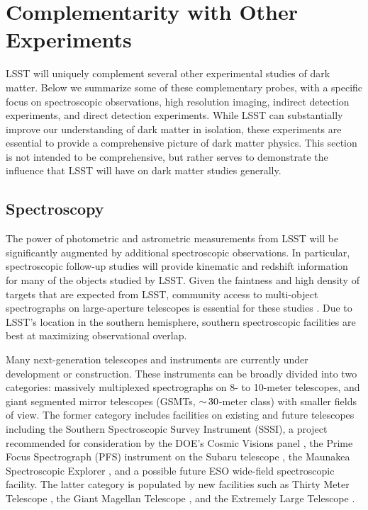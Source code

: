 \chapter{Complementarity with Other Experiments}
\label{sec:complementarity}
\bigskip

LSST will uniquely complement several other experimental studies of dark matter.
Below we summarize some of these complementary probes, with a specific focus on spectroscopic observations, high resolution imaging, indirect detection experiments, and direct detection experiments.
While LSST can substantially improve our understanding of dark matter in isolation, these experiments are essential to provide a comprehensive picture of dark matter physics.
This section is not intended to be comprehensive, but rather serves to demonstrate the influence that LSST will have on dark matter studies generally.

\section{Spectroscopy }
 \label{sec:spectroscopy}

The power of photometric and astrometric measurements from LSST will be significantly augmented by additional spectroscopic observations.
In particular, spectroscopic follow-up studies will provide kinematic and redshift information for many of the objects studied by LSST.
Given the faintness and high density of targets that are expected from LSST, community access to multi-object spectrographs on large-aperture telescopes is essential for these studies \citep{2016arXiv161001661N}. 
Due to LSST's location in the southern hemisphere, southern spectroscopic facilities are best at maximizing observational overlap.

Many next-generation telescopes and instruments are currently under development or construction. These instruments can be broadly divided into two categories: massively multiplexed spectrographs on 8- to 10-meter telescopes, and giant segmented mirror telescopes (GSMTs, $ {\sim}\, 30$-meter class) with smaller fields of view. The former category includes facilities on existing and future telescopes including the Southern Spectroscopic Survey Instrument (SSSI), a project recommended for consideration by the DOE’s Cosmic Visions panel \citep{1604.07626, 1604.07821}, the Prime Focus Spectrograph (PFS) instrument on the Subaru telescope \citep{2014PASJ...66R...1T}, the Maunakea Spectroscopic Explorer \citep[MSE;][]{MSEbook2018}, and a possible future ESO wide-field spectroscopic facility. 
The latter category is populated by new facilities such as Thirty Meter Telescope \citep[TMT;][]{1505.01195}, the Giant Magellan Telescope \citep[GMT;][]{GMT:2018}, and the Extremely Large Telescope \citep[ELT;][]{EELT:2009}. 

